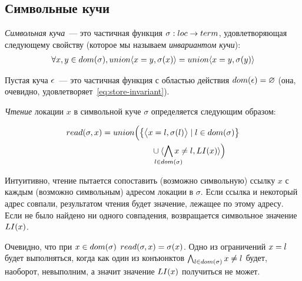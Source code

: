 \subsection{Символьные кучи}

\begin{defn}
\emph{Символьная куча}~--- это частичная функция $\sigma : loc \rightarrow term$, удовлетворяющая следующему свойству (которое мы называем \emph{инвариантом кучи}):
\begin{align}\label{eq:store-invariant}
	\forall x, y \in dom(\sigma), union{\langle x=y, \sigma(x)\rangle} = union{\langle x=y, \sigma(y)\rangle}
\end{align}
\end{defn}
%
\begin{defn}\label{def:empty-heap}
Пустая куча $\epsilon$~--- это частичная функция с областью действия $dom(\epsilon)=\varnothing$ (она, очевидно, удовлетворяет~\eqref{eq:store-invariant}).
\end{defn}
%
\begin{defn}\label{def:deref}
\emph{Чтение} локации $x$ в символьной куче $\sigma$ определяется следующим образом:
\vspace*{-0.3in}
\begin{figure}[h]
\begin{align}\label{eq:deref-formula}
	\deref{\sigma}{x}&\notag=\rdbody{x}{\sigma}{\li{x}}
\end{align}
\end{figure}
\vspace*{-0.4in}
\end{defn}
%
Интуитивно, чтение пытается сопоставить (возможно символьную) ссылку $x$ с каждым (возможно символьным) адресом локации в $\sigma$. Если ссылка и некоторый адрес совпали, результатом чтения будет значение, лежащее по этому адресу. Если не было найдено ни одного совпадения, возвращается символьное значение $LI(x)$.

Очевидно, что при $x\in dom(\sigma)$ $read(\sigma,x)=\sigma(x)$. Одно из ограничений $x=l$ будет выполняться, когда как один из конъюнктов $\bigwedge_{l\in dom(\sigma)}{x\neq l}$ будет, наоборот, невыполним, а значит значение $LI(x)$ получиться не может.

